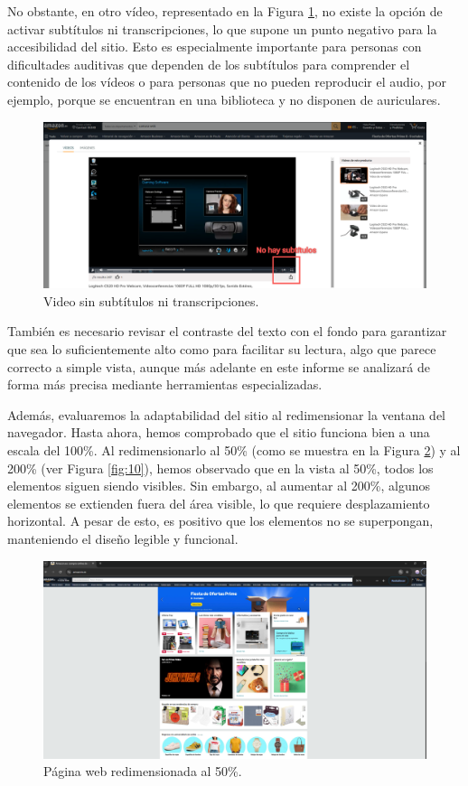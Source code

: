 \documentclass[letterpaper, 12pt]{report}
\begin{document}
No obstante, en otro vídeo, representado en la Figura \ref{fig:8}, no existe la opción de activar subtítulos ni transcripciones, lo que supone un punto negativo para la accesibilidad del sitio. Esto es especialmente importante para personas con dificultades auditivas que dependen de los subtítulos para comprender el contenido de los vídeos o para personas que no pueden reproducir el audio, por ejemplo, porque se encuentran en una biblioteca y no disponen de auriculares.

\begin{figure}[H]
\centering
\includegraphics[width=1\textwidth]{figure8.png}
\caption{Video sin subtítulos ni transcripciones.}
\label{fig:8}
\end{figure}

También es necesario revisar el contraste del texto con el fondo para garantizar que sea lo suficientemente alto como para facilitar su lectura, algo que parece correcto a simple vista, aunque más adelante en este informe se analizará de forma más precisa mediante herramientas especializadas.

Además, evaluaremos la adaptabilidad del sitio al redimensionar la ventana del navegador. Hasta ahora, hemos comprobado que el sitio funciona bien a una escala del 100\%. Al redimensionarlo al 50\% (como se muestra en la Figura \ref{fig:9}) y al 200\% (ver Figura \ref{fig:10}), hemos observado que en la vista al 50\%, todos los elementos siguen siendo visibles. Sin embargo, al aumentar al 200\%, algunos elementos se extienden fuera del área visible, lo que requiere desplazamiento horizontal. A pesar de esto, es positivo que los elementos no se superpongan, manteniendo el diseño legible y funcional.

\begin{figure}[H]
\centering
\includegraphics[width=1\textwidth]{figure9.png}
\caption{Página web redimensionada al 50\%.}
\label{fig:9}
\end{figure}
\end{document}

